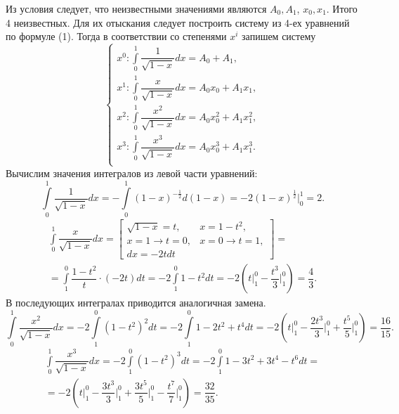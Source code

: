 \documentclass[a4paper, 12pt]{article}
\begin{document}
\begin{enumerate}
		Из условия следует, что неизвестными значениями являются $A_0, A_1$, $x_0, x_1$. Итого 4 неизвестных. Для их отыскания следует построить систему из 4-ех уравнений по формуле (1). Тогда в соответствии со степенями $x^i$ запишем систему
		$$\begin{cases}
			x^0 : \int\limits_{0}^1 \dfrac{1}{\sqrt{1-x}} dx = A_0 + A_1,\\
			x^1 : \int\limits_{0}^1 \dfrac{x}{\sqrt{1-x}} dx = A_0x_0 + A_1x_1,\\
			x^2 : \int\limits_{0}^1 \dfrac{x^2}{\sqrt{1-x}} dx = A_0x_0^2 + A_1x_1^2,\\
			x^3 : \int\limits_{0}^1 \dfrac{x^3}{\sqrt{1-x}} dx = A_0x_0^3 + A_1x_1^3.\\
		\end{cases}$$ 
		Вычислим значения интегралов из левой части уравнений:
		$$\int\limits_{0}^1 \dfrac{1}{\sqrt{1-x}} dx = -\int\limits_0^1 (1-x)^{-\frac12} d(1-x) = -2(1-x)^{\frac12}\Big|_0^1 = 2.$$
		\begin{multline*}\int\limits_{0}^1 \dfrac{x}{\sqrt{1-x}} dx = \left[\begin{matrix}\sqrt{1-x} = t, & x = 1-t^2, \\ x=1 \to t=0, & x=0 \to t = 1, \\ dx = -2tdt\end{matrix}\right] =\\= \int\limits_1^0\dfrac{1-t^2}{t} \cdot (-2t)dt = -2\int\limits_1^0 1-t^2 dt = -2 \left(t\Big|_ 1^0 - \dfrac{t^3}{3}\Big|_ 1^0\right) = \dfrac43.\end{multline*}
		В последующих интегралах приводится аналогичная замена.
		$$\int\limits_{0}^1 \dfrac{x^2}{\sqrt{1-x}} dx = -2\int\limits_1^0 (1-t^2)^2 dt =-2\int\limits_1^0 1 - 2t^2 + t^4 dt= -2 \left(t\Big|_ 1^0 - \dfrac{2t^3}{3}\Big|_ 1^0 + \dfrac{t^5}{5}\Big|_ 1^0\right) = \dfrac{16}{15}.$$
		\begin{multline*}
			\int\limits_{0}^1 \dfrac{x^3}{\sqrt{1-x}} dx = -2\int\limits_1^0 (1-t^2)^3 dt =-2\int\limits_1^0 1 - 3t^2 + 3t^4 -t^6 dt=\\= -2 \left(t\Big|_ 1^0 - \dfrac{3t^3}{3}\Big|_ 1^0 + \dfrac{3t^5}{5}\Big|_ 1^0 - \dfrac{t^7}{7}\Big|_ 1^0\right) = \dfrac{32}{35}.
		\end{multline*}
		

\end{enumerate}
\end{document}
